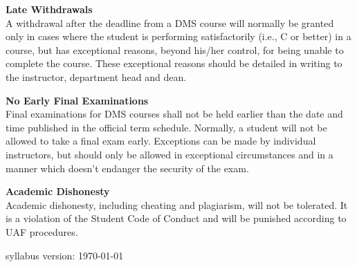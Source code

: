\documentclass[12pt]{article}
\renewcommand{\emph}[1]{\textsf{\textbf{#1}}}
\newcommand{\localhead}[1]{\par\smallskip\textbf{#1}\nobreak\\}%
\def\subheading#1{\localhead{\emph{#1}}}
\begin{document}
\subheading{Late Withdrawals} 
A withdrawal after the deadline from a DMS course will normally be granted only in cases where the student is performing satisfactorily (i.e., C or better) in a course, but has exceptional reasons, beyond his/her control, for being unable to complete the course. These exceptional reasons should be detailed in writing to the instructor, department head and dean.

\subheading{No Early Final Examinations}
Final examinations for DMS courses shall not be held earlier than the date and time published in the official term schedule. Normally, a student will not be allowed to take a final exam early. Exceptions can be made by individual instructors, but should only be allowed in exceptional circumstances and in a manner which doesn't endanger the security of the exam.

\subheading{Academic Dishonesty}
Academic dishonesty, including cheating and plagiarism, will not be tolerated.  It is a violation of the Student Code of Conduct and will be punished according to UAF procedures.

\vfill
\hfill \scriptsize syllabus version: \today \normalsize
\end{document}
